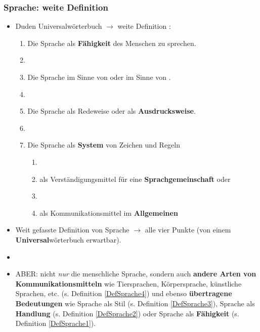 \begin{frame}

\frametitle{Sprache: weite Definition}

\begin{itemize}
	\item<1-> Duden Universalwörterbuch $\rightarrow$ weite Definition \citep[vgl.][]{Duden13a}:
	
	\begin{enumerate}
		\item<2->\label{DefSprache1} Die Sprache als \textbf{Fähigkeit} des Menschen zu sprechen.
		\item[]
		\item<3->\label{DefSprache2} Die Sprache im Sinne von  oder im Sinne von .
		\item[]
		\item<4->\label{DefSprache3} Die Sprache als Redeweise oder als \textbf{Ausdrucksweise}.
		\item[]
		\item<5->\label{DefSprache4} Die Sprache als \textbf{System} von Zeichen und Regeln

		\begin{enumerate}
			\item[]
			\item<5->\label{DefSprache4a} als Verständigungsmittel für eine \textbf{Sprachgemeinschaft} oder
			\item[]
			\item<5->\label{DefSprache4b} als Kommunikationsmittel im \textbf{Allgemeinen}
		\end{enumerate}
			
	\end{enumerate}
	
\end{itemize}

\end{frame}



\begin{frame}
		
\begin{itemize}
	\item<1-> Weit gefasste Definition von Sprache $\rightarrow$ alle vier Punkte (von einem \textbf{Universal}wörterbuch erwartbar).
	\item[]
	\item<2-> ABER: nicht \textit{nur} die menschliche Sprache, sondern auch \textbf{andere Arten von Kommunikationsmitteln} wie Tiersprachen, Körpersprache, künstliche Sprachen, etc. (s. Definition \ref{DefSprache4}) und ebenso \textbf{übertragene Bedeutungen} wie Sprache als Stil (s. Definition 	\ref{DefSprache3}), Sprache als \textbf{Handlung} (s. Definition \ref{DefSprache2}) oder Sprache als \textbf{Fähigkeit} (s. Definition \ref{DefSprache1}).

\end{itemize}
		
\end{frame}



